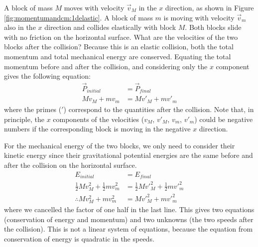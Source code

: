 \begin{example}{\label{ex:momentumandcm:1delastic}
A block of mass $M$ moves with velocity $\vec v_M$ in the $x$ direction, as shown in Figure \ref{fig:momentumandcm:1delastic}. A block of mass $m$ is moving with velocity $\vec v_m$ also in the $x$ direction and collides elastically with block $M$. Both blocks slide with no friction on the horizontal surface. What are the velocities of the two blocks after the collision?}
Because this is an elastic collision, both the total momentum and total mechanical energy are conserved. Equating the total momentum before and after the collision, and considering only the $x$ component gives the following equation:
\begin{align*}
\vec P_{initial} &=\vec P_{final}\\
Mv_M+mv_m&=Mv'_M+mv'_m
\end{align*}
where the primes ($'$) correspond to the quantities after the collision. Note that, in principle, the $x$ components of the velocities ($v_M$, $v'_M$, $v_m$, $v'_m$) could be negative numbers if the corresponding block is moving in the negative $x$ direction.

For the mechanical energy of the two blocks, we only need to consider their kinetic energy since their gravitational potential energies are the same before and after the collision on the horizontal surface.
\begin{align*}
E_{initial} &=E_{final}\\
\frac{1}{2}Mv_M^2+\frac{1}{2}mv_m^2&=\frac{1}{2}Mv'^2_M+\frac{1}{2}mv'^2_m\\
\therefore Mv_M^2+mv_m^2&=Mv'^2_M+mv'^2_m
\end{align*}
where we cancelled the factor of one half in the last line. This gives two equations (conservation of energy and momentum) and two unknowns (the two speeds after the collision). This is not a linear system of equations, because the equation from conservation of energy is quadratic in the speeds.


\end{example}
